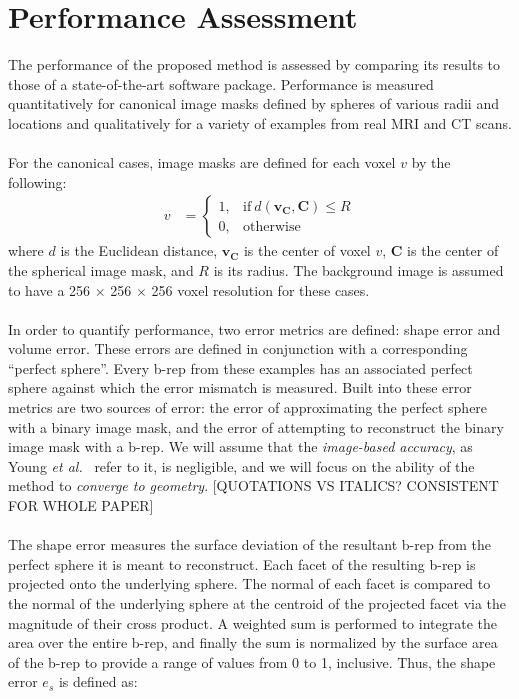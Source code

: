 \section{Performance Assessment}
%

The performance of the proposed method is assessed by comparing its results to those of a state-of-the-art software package. Performance is measured quantitatively for canonical image masks defined by spheres of various radii and locations and qualitatively for a variety of examples from real MRI and CT scans. \\ \\
%
For the canonical cases, image masks are defined for each voxel ${v}$ by the following:
\begin{align} 
	v &=  \begin{cases}
		1, & \text{if}\ d \left(\bm{v_C},\bm{C}\right) \le R \\
		0, & \text{otherwise}
	\end{cases}
\end{align}
where $d$ is the Euclidean distance, $\bm{v_C}$ is the center of voxel $v$, $\bm{C}$ is the center of the spherical image mask, and $R$ is its radius. The background image is assumed to have a 256 $\times$ 256 $\times$ 256 voxel resolution for these cases. \\ \\
%
In order to quantify performance, two error metrics are defined: shape error and volume error. These errors are defined in conjunction with a corresponding ``perfect sphere''. Every b-rep from these examples has an associated perfect sphere against which the error mismatch is measured. Built into these error metrics are two sources of error: the error of approximating the perfect sphere with a binary image mask, and the error of attempting to reconstruct the binary image mask with a b-rep. We will assume that the \textit{image-based accuracy}, as Young \textit{et al.}~\cite{young_2008} refer to it, is negligible, and we will focus on the ability of the method to \textit{converge to geometry}. [QUOTATIONS VS ITALICS? CONSISTENT FOR WHOLE PAPER]\\ \\
%
The shape error measures the surface deviation of the resultant b-rep from the perfect sphere it is meant to reconstruct. Each facet of the resulting b-rep is projected onto the underlying sphere. The normal of each facet is compared to the normal of the underlying sphere at the centroid of the projected facet via the magnitude of their cross product. A weighted sum is performed to integrate the area over the entire b-rep, and finally the sum is normalized by the surface area of the b-rep to provide a range of values from 0 to 1, inclusive. Thus, the shape error $e_s$ is defined as:
